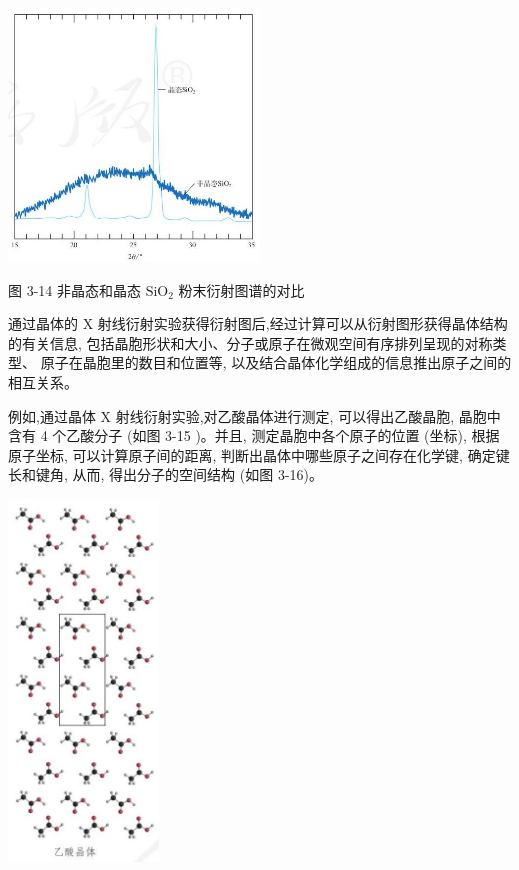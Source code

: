 \documentclass[10pt]{article}
\begin{document}
\begin{center}
\includegraphics[max width=0.5\textwidth]{images/0190e026-5a11-7df7-bd27-54d09026ba7a_78_731967.jpg}
\end{center}

图 3-14 非晶态和晶态 \({\mathrm{{SiO}}}_{2}\) 粉末衍射图谱的对比

通过晶体的 \(\mathrm{X}\) 射线衍射实验获得衍射图后,经过计算可以从衍射图形获得晶体结构的有关信息, 包括晶胞形状和大小、分子或原子在微观空间有序排列呈现的对称类型、 原子在晶胞里的数目和位置等, 以及结合晶体化学组成的信息推出原子之间的相互关系。

例如,通过晶体 \(\mathrm{X}\) 射线衍射实验,对乙酸晶体进行测定, 可以得出乙酸晶胞, 晶胞中含有 4 个乙酸分子 (如图 3-15 )。并且, 测定晶胞中各个原子的位置 (坐标), 根据原子坐标, 可以计算原子间的距离, 判断出晶体中哪些原子之间存在化学键, 确定键长和键角, 从而, 得出分子的空间结构 (如图 3-16)。

\begin{center}
\includegraphics[max width=0.3\textwidth]{images/0190e026-5a11-7df7-bd27-54d09026ba7a_79_195377.jpg}
\end{center}
\end{document}
